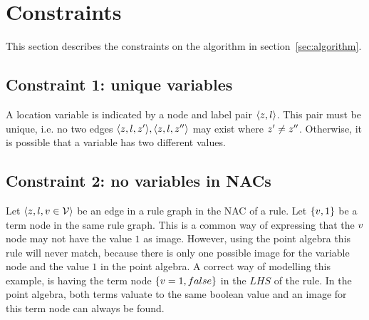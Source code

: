 \section{Constraints}

This section describes the constraints on the algorithm in section~\ref{sec:algorithm}.

\subsection{Constraint 1: unique variables}
A location variable is indicated by a node and label pair $\langle z, l\rangle$. This pair must be unique, i.e. no two edges $\langle z, l, z'\rangle, \langle z, l, z''\rangle$ may exist where $z' \neq z''$. Otherwise, it is possible that a variable has two different values.

\begin{comment}
\subsection{Constraint 2: variable persistency}
All locations variables in an STS are initialized and no new variables are added. In a GG, it is possible to delete and create new variables in the transformation rules. 
Dit is eigenlijk geen probleem, zolang aan constraint 1 gehouden wordt. En dat is of triviaal of onmogelijk.
\end{comment}

\subsection{Constraint 2: no variables in NACs}
Let $\langle z, l, v \in \mathcal{V}\rangle$ be an edge in a rule graph in the NAC of a rule. Let $\{v, 1\}$ be a term node in the same rule graph. This is a common way of expressing that the $v$ node may not have the value $1$ as image. However, using the point algebra this rule will never match, because there is only one possible image for the variable node and the value $1$ in the point algebra. A correct way of modelling this example, is having the term node $\{v = 1, false\}$ in the $\mathit{LHS}$ of the rule. In the point algebra, both terms valuate to the same boolean value and an image for this term node can always be found.

